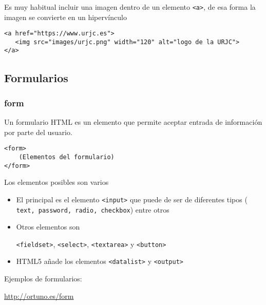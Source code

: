 \documentclass[ucs]{beamer}
\begin{document}
\begin{frame}[fragile]
\frametitle{}
Es muy habitual incluir una imagen dentro de un elemento 
\verb|<a>|, de esa forma la imagen se convierte en un hipervínculo

  \begin{footnotesize}
  \begin{verbatim}
<a href="https://www.urjc.es">
   <img src="images/urjc.png" width="120" alt="logo de la URJC">
</a>
  \end{verbatim}
  \end{footnotesize}


\end{frame}


\subsection{Formularios}
\begin{frame}[fragile]
\frametitle{form}

Un formulario HTML es un elemento que permite aceptar entrada de información por parte
del usuario.

  \begin{scriptsize}
  \begin{verbatim}
<form>
    (Elementos del formulario)
</form>
  \end{verbatim}
  \end{scriptsize}


Los elementos posibles son varios  
    \begin{itemize}
    \item
El principal es el elemento
\verb|<input>|
que puede de ser de diferentes tipos (
\verb|text, password, radio, checkbox|) entre otros

    \item
Otros elementos son

\verb|<fieldset>|,
\verb|<select>|,
\verb|<textarea>| y
\verb|<button>|

    \item
HTML5 añade los elementos
\verb|<datalist>| y
\verb|<output>|

    \end{itemize}

Ejemplos de formularios:

\url{http://ortuno.es/form}

\end{frame}
\end{document}

